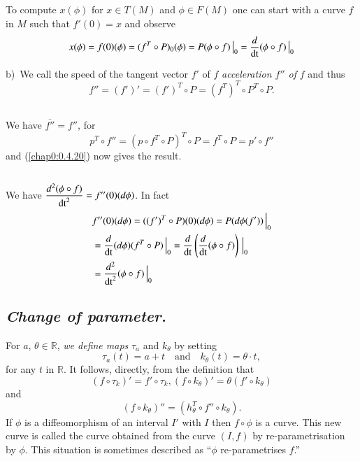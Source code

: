 \setcounter{subsection}{7}
\subsection{}\label{chap0:0.5.8}
\pageoriginale
To compute $x(\phi)$ for $x\in T(M)$ and $\phi\in F(M)$ one can start
with a curve $f$ in $M$ such that $f'(0)=x$ and observe
$$
x(\phi)=f(0)(\phi)=(f^{T}\circ P)_{0}(\phi)=P(\phi\circ
f)\,\big|_{0}=\dfrac{d}{\operatorname{dt}}(\phi\circ f)\,\big|_{0}
$$

b)~We call the speed of the tangent vector $f'$ of $f$ {\em
acceleration $f''$ of} $f$ and thus 
$$
f''=(f')'=(f')^{T}\circ P=(f^{T})^{T}\circ P^{T}\circ P.
$$

\setcounter{subsection}{8}

\subsection{}\label{chap0:0.5.9}

\begin{remarks*}
We have $\overline{f''}=f''$, for
$$
p^{T}\circ f''=(p\circ f^{T}\circ P)^{T}\circ P=f^{T}\circ P=p'\circ
f'' 
$$
and (\ref{chap0:0.4.20}) now gives the result.
\end{remarks*}

\setcounter{subsection}{9}
\subsection{}\label{chap0:0.5.10}

We have $\dfrac{d^{2}(\phi\circ f)}{\operatorname{dt}^{2}}=f''(0)(d\phi)$. In fact
\begin{align*}
& f''(0)(d\phi)=((f')^{T}\circ P)(0)(d\phi)=P(d\phi(f')) \, \Big|_{0}\\
& =\dfrac{d}{\operatorname{dt}}(d\phi)(f^{T}\circ
P)\, \Big|_{0}=\dfrac{d}{\operatorname{dt}}\left(\dfrac{d}{\operatorname{dt}}(\phi\circ
f)\right)\,\Big|_{0}\\
&= \dfrac{d^{2}}{\operatorname{dt}^{2}}(\phi\circ f)\, \Big|_{0}
\end{align*}

\subsection{\em Change of parameter.}\label{chap0:0.5.11}

For $a$, $\theta\in \mathbb{R}$, {\em we define maps} $\tau_{a}$ and
$k_{\theta}$ by setting
$$
\tau_{a}(t)=a+t\quad\text{and}\quad k_{\theta}(t)=\theta\cdot t,
$$
for any $t$ in $\mathbb{R}$. It follows, directly, from the definition
that
$$
(f\circ \tau_{k})'=f'\circ \tau_{k}, (f\circ
k_{\theta})'=\theta(f'\circ k_{\theta})
$$
and\pageoriginale
$$
(f\circ k_{\theta})''=(h^{T}_{\theta}\circ f''\circ k_{\theta}).
$$
If $\phi$ is a diffeomorphism of an interval $I'$ with $I$ then
$f\circ\phi$ is a curve. This new curve is called the curve obtained
from the curve $(I,f)$ by re-parametrisation by $\phi$. This situation
is sometimes described as ``$\phi$ re-parametrises $f$.''


